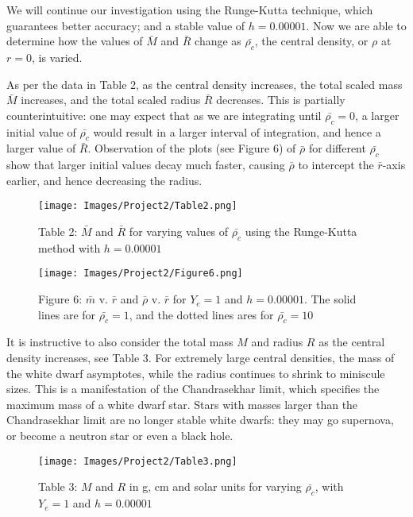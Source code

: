 \documentclass[10pt]{article}
\begin{document}
{ \bigskip

We will continue our investigation using the Runge-Kutta technique, which guarantees better accuracy; and a stable value of $h=0.00001$. Now we are able to determine how the values of $\bar{M}$ and $\bar{R}$ change as $\bar{\rho_c}$, the central density, or $\rho$ at $r=0$, is varied.


As per the data in Table 2, as the central density increases, the total scaled mass $\bar{M}$ increases, and the total scaled radius $\bar{R}$ decreases. This is partially counterintuitive: one may expect that as we are integrating until $\bar{\rho_c} = 0$, a larger initial value of $\bar{\rho_c}$ would result in a larger interval of integration, and hence a larger value of $\bar{R}$. Observation of the plots (see Figure 6) of $\bar{\rho}$ for different $\bar{\rho_c}$ show that larger initial values decay much faster, causing $\bar{\rho}$ to intercept the $\bar{r}$-axis earlier, and hence decreasing the radius. \\

\begin{figure}[h!]
\texttt{[image: Images/Project2/Table2.png]} \centering \caption*{\footnotesize Table 2: $\bar{M}$ and $\bar{R}$ for varying values of $\bar{\rho_c}$ using the Runge-Kutta method with $h = 0.00001$} \end{figure}

\begin{figure}[h!]
\texttt{[image: Images/Project2/Figure6.png]} \centering \caption* {\footnotesize Figure 6: $\bar{m}$ v. $\bar{r}$ and $\bar{\rho}$ v. $\bar{r}$ for $Y_e = 1$ and $h = 0.00001$. The solid lines are for $\bar{\rho_c} = 1$, and the dotted lines ares for $\bar{\rho_c} = 10$} \end{figure}


It is instructive to also consider the total mass $M$ and radius $R$ as the central density increases, see Table 3. For extremely large central densities, the mass of the white dwarf asymptotes, while the radius continues to shrink to miniscule sizes. This is a manifestation of the Chandrasekhar limit, which specifies the maximum mass of a white dwarf star. Stars with masses larger than the Chandrasekhar limit are no longer stable white dwarfs: they may go supernova, or become a neutron star or even a black hole.

\begin{figure}[h]
\texttt{[image: Images/Project2/Table3.png]} \centering \caption*{\footnotesize Table 3: $M$ and $R$ in g, cm and solar units for varying $\bar{\rho_c}$, with $Y_e = 1$ and $h = 0.00001$} \end{figure}

}
\end{document}
